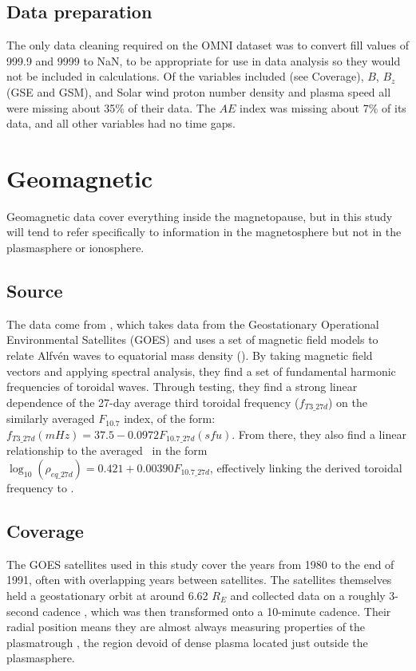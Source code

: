 \subsection{Data preparation}
The only data cleaning required on the OMNI dataset was to convert fill values of 999.9 and 9999 to NaN, to be appropriate for use in data analysis so they would not be included in calculations. Of the variables included (see Coverage), $B$, $B_z$ (GSE and GSM), and Solar wind proton number density and plasma speed all were missing about 35\% of their data. The $AE$ index was missing about 7\% of its data, and all other variables had no time gaps.

\section{Geomagnetic}
Geomagnetic data cover everything inside the magnetopause, but in this study will tend to refer specifically to information in the magnetosphere but not in the plasmasphere or ionosphere. 

\subsection{Source}
The data come from \cite{Takahashi2010SolarCycleVariation}, which takes data from the Geostationary Operational Environmental Satellites (GOES) and uses a set of magnetic field models to relate Alfvén waves to equatorial mass density (\req). By taking magnetic field vectors and applying spectral analysis, they find a set of fundamental harmonic frequencies of toroidal waves. Through testing, they find a strong linear dependence of the 27-day average third toroidal frequency ($f_{T3\_27d}$) on the similarly averaged $F_{10.7}$ index, of the form: $f_{T3\_27d}(mHz)=37.5-0.0972 F_{10.7\_27d}(sfu)$. From there, they also find a linear relationship to the averaged \req\ in the form $\log_{10}(\rho_{eq\_27d})=0.421+0.00390 F_{10.7\_27d}$, effectively linking the derived toroidal frequency to \req.

\subsection{Coverage}
The GOES satellites used in this study cover the years from 1980 to the end of 1991, often with overlapping years between satellites. The satellites themselves held a geostationary orbit at around 6.62 $R_E$ and collected data on a roughly 3-second cadence \citep{GOESDataSource}, which was then transformed onto a 10-minute cadence. Their radial position means they are almost always measuring properties of the plasmatrough , the region devoid of dense plasma located just outside the plasmasphere.

